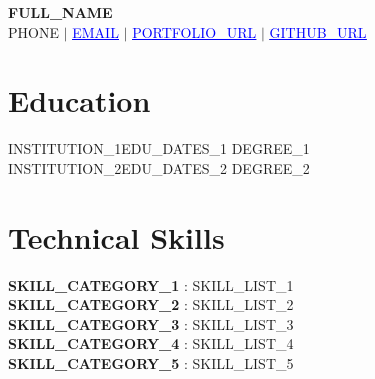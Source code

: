 

\begin{center}
    \textbf{\Large \scshape {{FULL_NAME}}} \\ \vspace{2pt}
    \small {{PHONE}} $|$
    \href{mailto:{{EMAIL}}}{\textcolor{blue}{\underline{{{EMAIL}}}}} $|$
    \href{{{PORTFOLIO_URL}}}{\textcolor{blue}{\underline{{{PORTFOLIO_URL}}}}} $|$
    \href{{{GITHUB_URL}}}{\textcolor{blue}{\underline{{{GITHUB_URL}}}}}
\end{center}
\vspace{-6pt}

\section{Education}
  \resumeSubHeadingListStart
    \resumeSubheading
      {{{INSTITUTION_1}}}{{{EDU_DATES_1}}}
      {{{DEGREE_1}}}{}
    \resumeSubheading
      {{{INSTITUTION_2}}}{{{EDU_DATES_2}}}
      {{{DEGREE_2}}}{}
  \resumeSubHeadingListEnd

\section{Technical Skills}
\begin{itemize}[leftmargin=0.0in, label={}]
    \small{\item{
        \textbf{ {{SKILL_CATEGORY_1}} }{: {{SKILL_LIST_1}} } \\
        \textbf{ {{SKILL_CATEGORY_2}} }{: {{SKILL_LIST_2}} } \\
        \textbf{ {{SKILL_CATEGORY_3}} }{: {{SKILL_LIST_3}} } \\
        \textbf{ {{SKILL_CATEGORY_4}} }{: {{SKILL_LIST_4}} } \\
        \textbf{ {{SKILL_CATEGORY_5}} }{: {{SKILL_LIST_5}} }
    }}
\end{itemize}
\vspace{-4pt}

